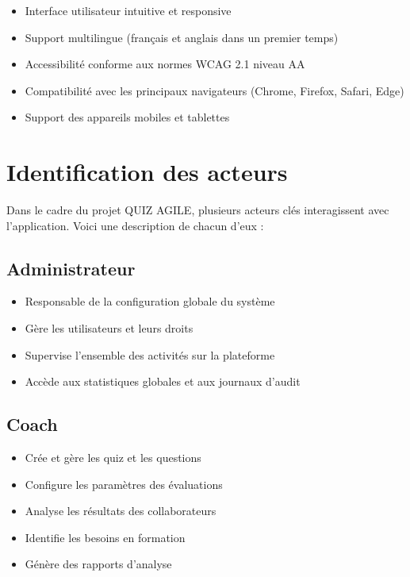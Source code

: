 \documentclass[12pt,a4paper]{report}
\begin{document}
\begin{itemize}
\item Interface utilisateur intuitive et responsive
\item Support multilingue (français et anglais dans un premier temps)
\item Accessibilité conforme aux normes WCAG 2.1 niveau AA
\item Compatibilité avec les principaux navigateurs (Chrome, Firefox, Safari, Edge)
\item Support des appareils mobiles et tablettes
\end{itemize}

\section{Identification des acteurs}

Dans le cadre du projet QUIZ AGILE, plusieurs acteurs clés interagissent avec l'application. Voici une description de chacun d'eux :

\subsection{Administrateur}

\begin{itemize}
\item Responsable de la configuration globale du système
\item Gère les utilisateurs et leurs droits
\item Supervise l'ensemble des activités sur la plateforme
\item Accède aux statistiques globales et aux journaux d'audit
\end{itemize}

\subsection{Coach}

\begin{itemize}
\item Crée et gère les quiz et les questions
\item Configure les paramètres des évaluations
\item Analyse les résultats des collaborateurs
\item Identifie les besoins en formation
\item Génère des rapports d'analyse
\end{itemize}
\end{document}
